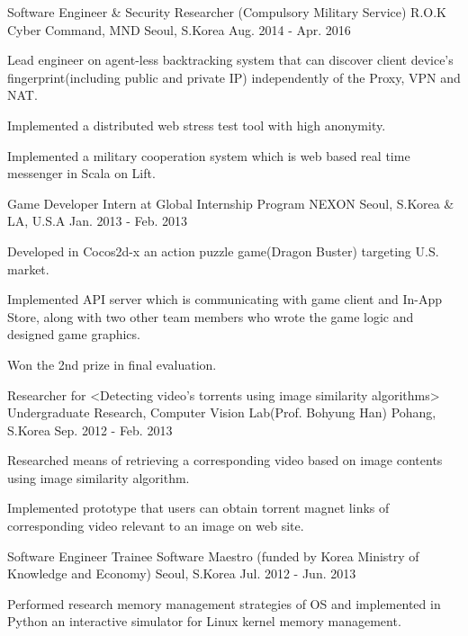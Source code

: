 \documentclass[11pt, a4paper]{../awesome-cv}
\begin{document}
\begin{cventries}
\cventry
    {Software Engineer \& Security Researcher (Compulsory Military Service)} {R.O.K Cyber Command, MND} {Seoul, S.Korea} {Aug. 2014 - Apr. 2016} {
      \begin{cvitems} \item {Lead engineer on agent-less backtracking system that can discover client device's fingerprint(including public and private IP) independently of the Proxy, VPN and NAT.}
        \item {Implemented a distributed web stress test tool with high anonymity.}
        \item {Implemented a military cooperation system which is web based real time messenger in Scala on Lift.}
      \end{cvitems}
    }

\cventry
    {Game Developer Intern at Global Internship Program} {NEXON} {Seoul, S.Korea \& LA, U.S.A} {Jan. 2013 - Feb. 2013} {
      \begin{cvitems} \item {Developed in Cocos2d-x an action puzzle game(Dragon Buster) targeting U.S. market.}
        \item {Implemented API server which is communicating with game client and In-App Store, along with two other team members who wrote the game logic and designed game graphics.}
        \item {Won the 2nd prize in final evaluation.}
      \end{cvitems}
    }

\cventry
    {Researcher for <Detecting video’s torrents using image similarity algorithms>} {Undergraduate Research, Computer Vision Lab(Prof. Bohyung Han)} {Pohang, S.Korea} {Sep. 2012 - Feb. 2013} {
      \begin{cvitems} \item {Researched means of retrieving a corresponding video based on image contents using image similarity algorithm.}
        \item {Implemented prototype that users can obtain torrent magnet links of corresponding video relevant to an image on web site.}
      \end{cvitems}
    }

\cventry
    {Software Engineer Trainee} {Software Maestro (funded by Korea Ministry of Knowledge and Economy)} {Seoul, S.Korea} {Jul. 2012 - Jun. 2013} {
      \begin{cvitems} \item {Performed research memory management strategies of OS and implemented in Python an interactive simulator for Linux kernel memory management.}
      \end{cvitems}
    }


\end{cventries}
\end{document}

